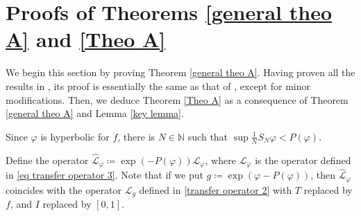 \documentclass[12pt]{amsart}
\numberwithin{equation}{section} %
\numberwithin{figure}{section} %
\theoremstyle{plain}
\theoremstyle{definition}
\theoremstyle{remark}
\theoremstyle{citing}
\newcommand{\N}{\mathbb{N}}
\renewcommand{\=}{\coloneqq}
\begin{document}
\section{Proofs of Theorems \ref{general theo A} and \ref{Theo A}}\label{sec: Proof of Theo B and C}
We begin this section by proving Theorem \ref{general theo A}. Having proven all the results in , its proof is essentially the same as that of \cite[Theorem B]{Juan1}, except for minor modifications. Then, we deduce Theorem \ref{Theo A} as a consequence of Theorem \ref{general theo A} and Lemma \ref{key lemma}.

Since $\varphi$ is hyperbolic for $f$, there is $N\in \N$ such that $\sup \frac{1}{N}S_N\varphi<P(\varphi)$. 

Define the operator $\widehat{\mathcal{L}}_\varphi \= \exp(-P(\varphi))\mathcal{L}_\varphi$, where $\mathcal{L}_{\varphi}$ is the operator defined in \eqref{eq transfer operator 3}. Note that if we put $g\=\exp(\varphi- P(\varphi))$, then $\widehat{\mathcal{L}}_\varphi$ coincides with the operator $\mathscr{L}_{g}$ defined in \eqref{transfer operator 2} with $T$ replaced by $f$, and $I$ replaced by $[0,1]$.
\end{document}
